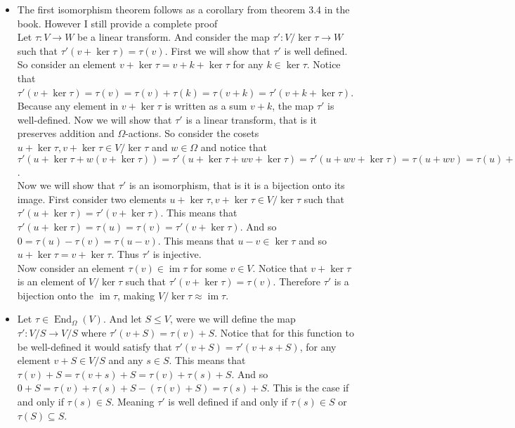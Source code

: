 \documentclass[12pt]{amsart}
\theoremstyle{definition}
\DeclareMathOperator{\kernel}{\mathrm{ker}}
\DeclareMathOperator{\image}{\mathrm{im}}
\DeclareMathOperator{\End}{\mathrm{End}}
\newcommand{\ra}{\rightarrow}
\newcommand{\se}{\subseteq}
\begin{document}
\begin{itemize}
\item[(3.3)] %
The first isomorphism theorem follows as a corollary from theorem 3.4 in the book. However I still provide a complete proof\\
Let $\tau:V\ra W$ be a linear transform. And consider the map $\tau':V/\kernel \tau\ra W$ such that $\tau'(v+\kernel \tau)=\tau(v)$. First we will show that $\tau'$ is well defined. So consider an element $v+\kernel\tau=v+k+\kernel\tau$ for any $k\in\kernel\tau$. Notice that $\tau'(v+\kernel\tau)=\tau(v)=\tau(v)+\tau(k)=\tau(v+k)=\tau'(v+k+\kernel\tau)$. Because any element in $v+\kernel\tau$ is written as a sum $v+k$, the map $\tau'$ is well-defined. Now we will show that $\tau'$ is a linear transform, that is it preserves addition and $\Omega$-actions. So consider the cosets $u+\kernel\tau ,v+\kernel\tau \in V/\kernel\tau$ and $w\in \Omega$ and notice that $\tau'(u+\kernel\tau +w(v+\kernel\tau))=\tau'(u+\kernel\tau +wv+\kernel\tau)=\tau'(u+wv+\kernel\tau)=\tau(u+wv)=\tau(u)+w\tau(v)=\tau'(u+\kernel\tau)+w\tau'(v+\kernel\tau)$.\\

Now we will show that $\tau'$ is an isomorphism, that is it is a bijection onto its image. First consider two elements $u+\kernel\tau ,v+\kernel\tau \in V/\kernel\tau$ such that $\tau'(u+\kernel\tau)=\tau'(v+\kernel\tau)$. This means that $\tau'(u+\kernel\tau)=\tau(u)=\tau(v)=\tau'(v+\kernel\tau)$. And so $0=\tau(u)-\tau(v)=\tau(u-v)$. This means that $u-v\in\kernel\tau$ and so $u+\kernel\tau=v+\kernel\tau$. Thus $\tau'$ is injective.\\

Now consider an element $\tau(v)\in\image\tau$ for some $v\in V$. Notice that $v+\kernel\tau$ is an element of $V/\kernel\tau$  such that $\tau'(v+\kernel\tau)=\tau(v)$. Therefore $\tau'$ is a bijection onto the $\image\tau$, making $V/\kernel\tau\approx\image\tau$.
\\
\item[(3.7)] %
Let $\tau\in \End_{\Omega}(V)$. And let $S\leq V$, were we will define the map $\tau':V/S\ra V/S$ where $\tau'(v+S)=\tau(v)+S$. Notice that for this function to be well-defined it would satisfy that $\tau'(v+S)=\tau'(v+s+S)$, for any element $v+S\in V/S$ and any $s\in S$. This means that $\tau(v)+S=\tau(v+s)+S=\tau(v)+\tau(s)+S$. And so $0+S=\tau(v)+\tau(s)+S-(\tau(v)+S)=\tau(s)+S$. This is the case if and only if $\tau(s)\in S$. Meaning $\tau'$ is well defined if and only if $\tau(s)\in S$ or $\tau(S)\se S$.\\


\end{itemize}
\end{document}

